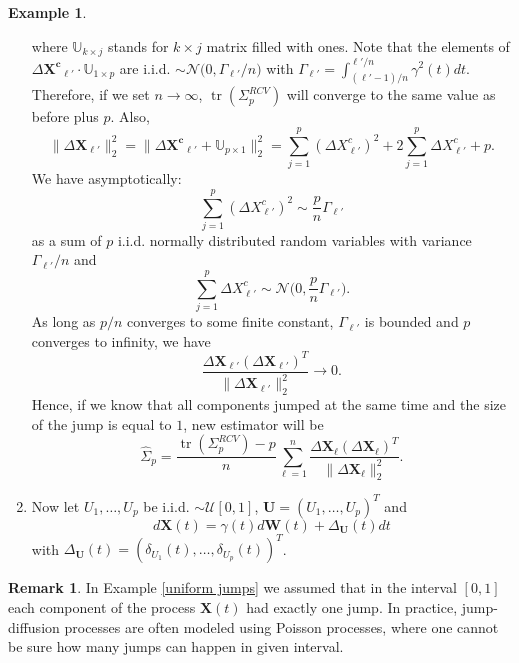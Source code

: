 \documentclass[a4paper,11pt]{article}
\theoremstyle{plain}
\theoremstyle{definition}
\newtheorem{exmp}[thm]{Example}
\newtheorem{rmrk}[thm]{Remark}
\newcommand{\tr}{\operatorname{tr}}
\begin{document}
\begin{exmp}
\begin{enumerate}
\[    		\]
    		where $\mathbb{U}_{k \times j}$ stands for $k \times j$ matrix filled with ones. Note that the elements of $\Delta \mathbf{X^c}_{\ell'} \cdot \mathbb{U}_{1 \times p}$ are i.i.d. $ \sim \mathcal{N}\big(0, \Gamma_{\ell'}/n )$ with $\Gamma_{\ell'}=\int_{(\ell' - 1)/n}^{\ell' / n} \gamma^2(t) dt$. Therefore, if we set $n \rightarrow \infty$, $\tr(\Sigma_p^{RCV})$ will converge to the same value as before plus $p$. Also,
    		\[
    		\| \Delta \mathbf{X}_{\ell'} \|_2^2 = \| \Delta \mathbf{X^c}_{\ell'} + \mathbb{U}_{p \times 1} \|_2^2  = \sum_{j=1}^{p} (\Delta X^c_{\ell'})^2 + 2\sum_{j=1}^{p} \Delta X^c_{\ell'} + p.
    		\]
    		We have asymptotically:
    		\[
    		\sum_{j=1}^{p} (\Delta X^c_{\ell'})^2 \sim \frac{p}{n}\Gamma_{\ell'}
    		\]
    		as a sum of $p$ i.i.d. normally distributed random variables with variance $\Gamma_{\ell'}/n$ and
    		\[ \sum_{j=1}^{p} \Delta X^c_{\ell'} \sim \mathcal{N}\Big(0, \frac{p}{n}\Gamma_{\ell'}\Big). \]
    		As long as $p/n$ converges to some finite constant, $\Gamma_{\ell'}$ is bounded and $p$ converges to infinity, we have
    		\[ 
    		\frac{\Delta \mathbf{X}_{\ell'}(\Delta \mathbf{X}_{\ell'})^T}{\| \Delta \mathbf{X}_{\ell'} \|_2^2} \rightarrow 0.
    		\]
    		Hence, if we know that all components jumped at the same time and the size of the jump is equal to $1$, new estimator will be
    		\[ 
    		\widehat{\Sigma}_p = \frac{\tr(\Sigma_p^{RCV}) - p}{n} \sum_{\ell=1}^{n} \frac{\Delta \mathbf{X}_{\ell}(\Delta \mathbf{X}_{\ell})^T}{\| \Delta \mathbf{X}_{\ell} \|_2^2}.
    		\]
    		
    		\item Now let $U_1, \dots, U_p$ be i.i.d. $\sim \mathcal{U}[0, 1]$, $\mathbf{U} = (U_1, \dots, U_p)^T$ and
    		\[ 
    		d\mathbf{X}(t) = \gamma(t)  d\mathbf{W}(t) + \Delta_\mathbf{U}(t) dt
    		\]
    		with $\Delta_\mathbf{U}(t) = (\delta_{U_1}(t), \dots, \delta_{U_p}(t))^T$.
    	\end{enumerate}
    \end{exmp}
    
    \begin{rmrk}
    	In Example \ref{uniform jumps} we assumed that in the interval $[0, 1]$ each component of the process $\mathbf{X}(t)$ had exactly one jump. In practice, jump-diffusion processes are often modeled using Poisson processes, where one cannot be sure how many jumps can happen in given interval.
    \end{rmrk}
    
\end{document}

